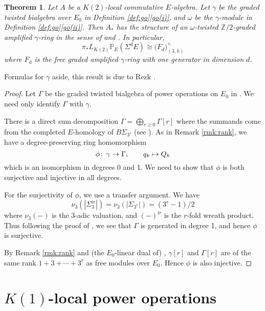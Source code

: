 \documentclass{gtpart}
\newtheorem{thm}{Theorem}
\theoremstyle{definition}
\theoremstyle{remark}
\def\co{\colon\thinspace}
\newcommand{\mb}[1]{\mathbb{#1}}
\newcommand{\BP}{{\mb P}}
\newcommand{\BZ}{{\mb Z}}
\newcommand{\G}{\Gamma}
\newcommand{\g}{\gamma}
\newcommand{\go}[1]{Definition \ref{def:go}\thinspace \eqref{go(#1)}}
\begin{document}
\begin{thm}
\label{thm:gamma}
 Let $A$ be a $K(2)$-local commutative $E$-algebra.  Let $\g$ be the 
 graded twisted bialgebra over $E_0$ in \go{i}, and $\omega$ be the 
 $\g$-module in \go{ii}.  Then $A_*$ has the structure of an 
 {\em $\omega$-twisted $\BZ/2$-graded amplified $\g$-ring} in the sense 
 of \cite[Section 2]{cong} and \cite[2.5 and 2.6]{h2p2}.  In particular, 
 \[
  \pi_* L_{K(2)} \BP_E (\Sigma^d E) \cong \big( F_d \big)_{(3,h)}^\wedge 
 \]
 where $F_d$ is the free graded amplified $\g$-ring with one generator 
 in dimension $d$.  
\end{thm}
Formulas for $\g$ aside, this result is due to Rezk \cite{cong, h2p2}.  
\begin{proof}
 Let $\G$ be the graded twisted bialgebra of power operations on $E_0$ 
 in \cite[Section 6]{cong}.  We need only identify $\G$ with $\g$.  

 There is a direct sum decomposition $\G = \bigoplus_{r \geq 0} \G[r]$ 
 where the summands come from the completed $E$-homology of 
 $B\Sigma_{3^r}$ (see \cite[6.2]{cong}).  As in Remark \ref{rmk:rank}, 
 we have a degree-preserving ring homomorphism 
 \[
  \phi \co \g \to \G, \qquad q_k \mapsto Q_k 
 \]
 which is an isomorphism in degrees 0 and 1.  We need to show that 
 $\phi$ is both surjective and injective in all degrees.  

 For the surjectivity of $\phi$, we use a transfer argument.  We have 
 \[
  \nu_3(|\Sigma_3^{\wr r}|) = \nu_3(|\Sigma_{3^r}|) = (3^r - 1) / 2 
 \]
 where $\nu_3(-)$ is the 3-adic valuation, and $(-)^{\wr r}$ is the 
 $r$-fold wreath product.  Thus following the proof of 
 \cite[Proposition 3.17]{cong}, we see that $\G$ is generated in degree 
 1, and hence $\phi$ is surjective.  

 By Remark \ref{rmk:rank} and (the $E_0$-linear dual of) 
 \cite[Theorem 1.1]{Str98}, $\g[r]$ and $\G[r]$ are of the same rank 
 $1 + 3 + \cdots + 3^r$ as free modules over $E_0$.  Hence $\phi$ is 
 also injective.  
\end{proof}


\section{$K(1)$-local power operations}
\label{sec:K(1)}
\end{document}
